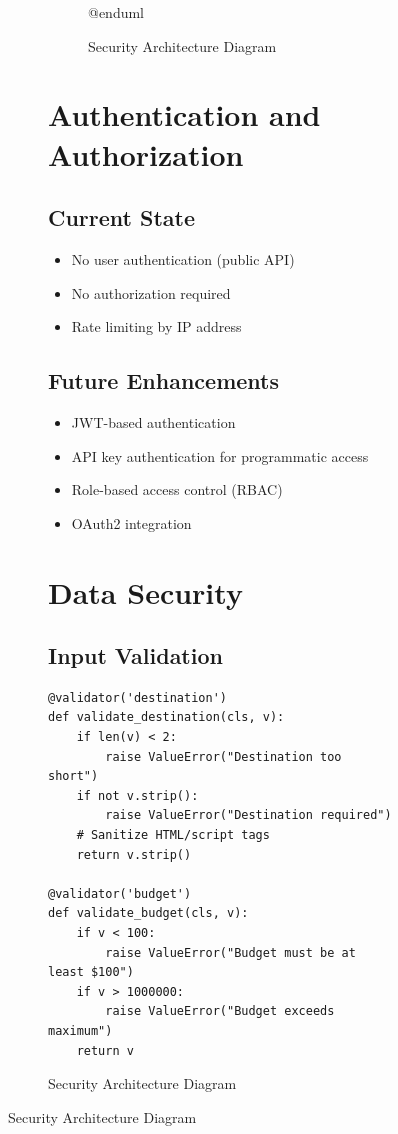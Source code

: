 \documentclass[12pt,a4paper]{report}
\begin{document}
\begin{figure}[H]
\begin{plantuml}
\begin{figure}[H]
\begin{plantuml}
\begin{figure}[H]
\begin{plantuml}
@enduml
    \end{plantuml}
    \caption{Security Architecture Diagram}
    \label{fig:security-arch}
\end{figure}

\section{Authentication and Authorization}

\subsection{Current State}
\begin{itemize}
    \item No user authentication (public API)
    \item No authorization required
    \item Rate limiting by IP address
\end{itemize}

\subsection{Future Enhancements}
\begin{itemize}
    \item JWT-based authentication
    \item API key authentication for programmatic access
    \item Role-based access control (RBAC)
    \item OAuth2 integration
\end{itemize}

\section{Data Security}

\subsection{Input Validation}

\begin{lstlisting}[style=pythonstyle, caption={Pydantic Validators}]
@validator('destination')
def validate_destination(cls, v):
    if len(v) < 2:
        raise ValueError("Destination too short")
    if not v.strip():
        raise ValueError("Destination required")
    # Sanitize HTML/script tags
    return v.strip()

@validator('budget')
def validate_budget(cls, v):
    if v < 100:
        raise ValueError("Budget must be at least $100")
    if v > 1000000:
        raise ValueError("Budget exceeds maximum")
    return v
\end{lstlisting}


\end{plantuml}
\end{figure}
\end{plantuml}
\end{figure}
\end{document}
